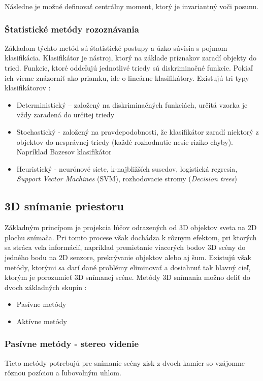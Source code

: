 Následne je možné definovať centrálny moment, ktorý je invariantný voči posunu. 


\subsubsection{Štatistické metódy rozoznávania}
Základom týchto metód sú štatistické postupy a úzko súvisia s pojmom klasifikácia. Klasifikátor je nástroj, ktorý na základe príznakov zaradí objekty do tried. Funkcie, ktoré oddeľujú jednotlivé triedy sú diskriminačné funkcie. Pokiaľ ich vieme znázorniť ako priamku, ide o lineárne klasifikátory. Existujú tri typy klasifikátorov \cite{pocitacove_videnie_v_praxi}:

\begin{itemize}
    \item Deterministický  – založený na diskriminačných funkciách, určitá vzorka je vždy zaradená do určitej triedy 
    \item Stochastický -  založený na pravdepodobnosti, že klasifikátor zaradí niektorý z objektov do nesprávnej triedy (každé rozhodnutie nesie riziko chyby). Napríklad Bazesov klasifikátor
    \item Heuristický - neurónové siete, k-najbližších susedov, logistická regresia, \textit{Support Vector Machines} (SVM), rozhodovacie stromy (\textit{Decision trees}) 
\end{itemize}

\subsection{3D snímanie priestoru}
Základným princípom je projekcia lúčov odrazených od 3D objektov sveta na 2D plochu snímača. Pri tomto procese však dochádza k rôznym efektom, pri ktorých sa stráca veľa informácií, napríklad premietanie viacerých bodov 3D scény do jedného bodu na 2D senzore, prekrývanie objektov alebo aj šum. Existujú však metódy, ktorými sa darí dané problémy eliminovať a dosiahnuť tak  hlavný cieľ, ktorým je porozumieť 3D snímanej scéne. Metódy 3D snímania možno deliť do dvoch základných skupín \cite{Analysis_and_Machine_Vision}:

\begin{itemize}
    \item Pasívne metódy
    \item Aktívne metódy 
\end{itemize}

\subsubsection{Pasívne metódy - stereo videnie}
Tieto metódy potrebujú pre snímanie scény zisk z dvoch kamier so vzájomne rôznou pozíciou a ľubovolným uhlom. 

